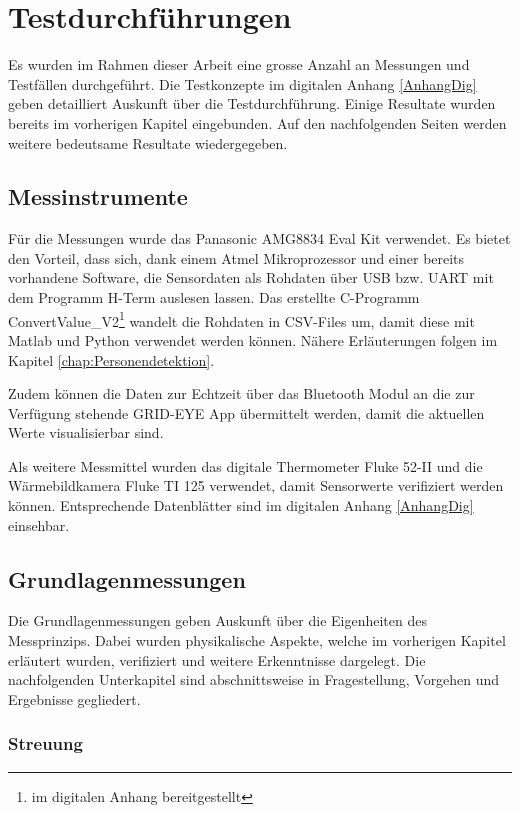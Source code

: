 \chapter{Testdurchführungen}
\label{chap:Testphasen}

Es wurden im Rahmen dieser Arbeit eine grosse Anzahl an Messungen und Testfällen durchgeführt. Die Testkonzepte im digitalen Anhang \ref{AnhangDig} geben detailliert Auskunft über die Testdurchführung. Einige Resultate wurden bereits im vorherigen Kapitel eingebunden. Auf den nachfolgenden Seiten werden weitere bedeutsame Resultate wiedergegeben. 

\section{Messinstrumente}

Für die Messungen wurde das Panasonic AMG8834 Eval Kit verwendet. Es bietet den Vorteil, dass sich, dank einem Atmel Mikroprozessor und einer bereits vorhandene Software, die Sensordaten als Rohdaten über USB bzw. \ac{UART} mit dem Programm H-Term auslesen lassen. 
Das erstellte C-Programm ConvertValue\_V2\footnote[12]{im digitalen Anhang bereitgestellt} wandelt die Rohdaten in \ac{CSV}-Files um, damit diese mit Matlab und Python verwendet werden können. Nähere Erläuterungen folgen im Kapitel \ref{chap:Personendetektion}.

Zudem können die Daten zur Echtzeit über das Bluetooth Modul an die zur Verfügung stehende GRID-EYE App übermittelt werden, damit die aktuellen Werte visualisierbar sind.

Als weitere Messmittel wurden das digitale Thermometer Fluke 52-II und die Wärmebildkamera Fluke TI 125 verwendet, damit Sensorwerte verifiziert werden können. Entsprechende Datenblätter sind im digitalen Anhang \ref{AnhangDig} einsehbar.

\section{Grundlagenmessungen}

Die Grundlagenmessungen geben Auskunft über die Eigenheiten des Messprinzips. Dabei wurden physikalische Aspekte, welche im vorherigen Kapitel erläutert wurden, verifiziert und weitere Erkenntnisse dargelegt. Die nachfolgenden Unterkapitel sind abschnittsweise in Fragestellung, Vorgehen und Ergebnisse gegliedert.

\subsection{Streuung}

